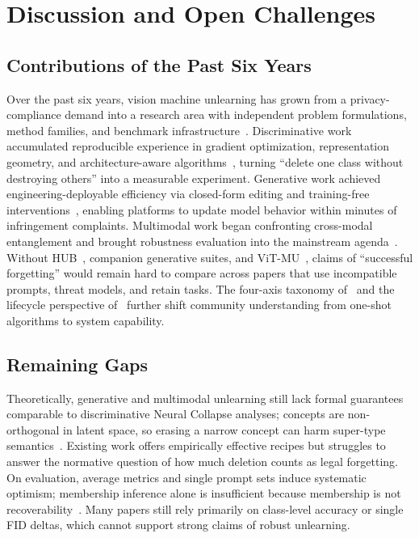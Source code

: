 \documentclass[10pt,twocolumn,letterpaper]{article}
\begin{document}
\section{Discussion and Open Challenges}

\subsection{Contributions of the Past Six Years}

Over the past six years, vision machine unlearning has grown from a privacy-compliance demand into a research area with independent problem formulations, method families, and benchmark infrastructure~\cite{bourtoule2021,safavigerdini2026}. Discriminative work accumulated reproducible experience in gradient optimization, representation geometry, and architecture-aware algorithms~\cite{kurmanji2023scrub,zhao2026vit,safavigerdini2026}, turning ``delete one class without destroying others'' into a measurable experiment. Generative work achieved engineering-deployable efficiency via closed-form editing and training-free interventions~\cite{gandikota2023esd,gandikota2024uce,lu2024mace}, enabling platforms to update model behavior within minutes of infringement complaints. Multimodal work began confronting cross-modal entanglement and brought robustness evaluation into the mainstream agenda~\cite{lin2026vlm}. Without HUB~\cite{moon2025hub}, companion generative suites, and ViT-MU~\cite{zhao2026vit}, claims of ``successful forgetting'' would remain hard to compare across papers that use incompatible prompts, threat models, and retain tasks. The four-axis taxonomy of~\cite{safavigerdini2026} and the lifecycle perspective of~\cite{marasco2026} further shift community understanding from one-shot algorithms to system capability.

\subsection{Remaining Gaps}

Theoretically, generative and multimodal unlearning still lack formal guarantees comparable to discriminative Neural Collapse analyses; concepts are non-orthogonal in latent space, so erasing a narrow concept can harm super-type semantics~\cite{safavigerdini2026}. Existing work offers empirically effective recipes but struggles to answer the normative question of how much deletion counts as legal forgetting. On evaluation, average metrics and single prompt sets induce systematic optimism; membership inference alone is insufficient because membership is not recoverability~\cite{safavigerdini2026}. Many papers still rely primarily on class-level accuracy or single FID deltas, which cannot support strong claims of robust unlearning.
\end{document}
